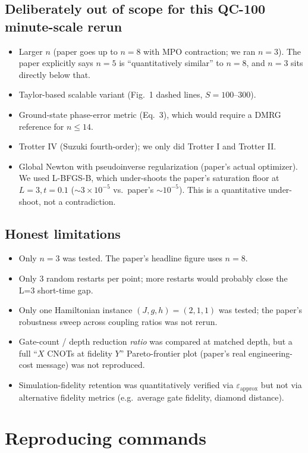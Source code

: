\documentclass[11pt]{article}
\begin{document}
\subsection*{Deliberately out of scope for this QC-100 minute-scale rerun}
\begin{itemize}
  \item Larger $n$ (paper goes up to $n=8$ with MPO contraction; we ran $n=3$). The paper explicitly says $n=5$ is ``quantitatively similar'' to $n=8$, and $n=3$ sits directly below that.
  \item Taylor-based scalable variant (Fig.~1 dashed lines, $S=100$--$300$).
  \item Ground-state phase-error metric (Eq.~3), which would require a DMRG reference for $n \leq 14$.
  \item Trotter IV (Suzuki fourth-order); we only did Trotter I and Trotter II.
  \item Global Newton with pseudoinverse regularization (paper's actual optimizer). We used L-BFGS-B, which under-shoots the paper's saturation floor at $L=3, t=0.1$ ($\sim 3\times 10^{-5}$ vs.\ paper's $\sim 10^{-5}$). This is a quantitative under-shoot, not a contradiction.
\end{itemize}

\subsection*{Honest limitations}
\begin{itemize}
  \item Only $n=3$ was tested. The paper's headline figure uses $n=8$.
  \item Only 3 random restarts per point; more restarts would probably close the L=3 short-time gap.
  \item Only one Hamiltonian instance $(J,g,h) = (2,1,1)$ was tested; the paper's robustness sweep across coupling ratios was not rerun.
  \item Gate-count / depth reduction \emph{ratio} was compared at matched depth, but a full ``$X$ CNOTs at fidelity $Y$'' Pareto-frontier plot (paper's real engineering-cost message) was not reproduced.
  \item Simulation-fidelity retention was quantitatively verified via $\varepsilon_{\text{approx}}$ but not via alternative fidelity metrics (e.g.\ average gate fidelity, diamond distance).
\end{itemize}

\section{Reproducing commands}
\end{document}
